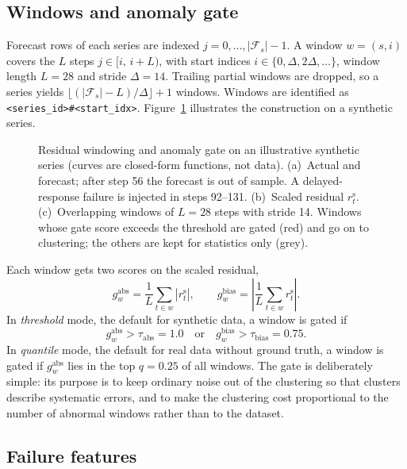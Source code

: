 \documentclass[10pt,twocolumn,a4paper]{article}
\newcommand{\rS}{r^{\mathrm{s}}}
\begin{document}
\subsection{Windows and anomaly gate}
\label{sec:gate}

Forecast rows of each series are indexed $j = 0,\dots,|\mathcal F_s|-1$. A window $w=(s,i)$ covers the $L$ steps $j\in[i,\,i+L)$, with start indices $i\in\{0,\Delta,2\Delta,\dots\}$, window length $L=28$ and stride $\Delta=14$. Trailing partial windows are dropped, so a series yields $\lfloor(|\mathcal F_s|-L)/\Delta\rfloor+1$ windows. Windows are identified as \texttt{<series\_id>\#<start\_idx>}. Figure~\ref{fig:window} illustrates the construction on a synthetic series.

\begin{figure}[t]
  \centering
  
  \caption{Residual windowing and anomaly gate on an illustrative synthetic series (curves are closed-form functions, not data). (a)~Actual and forecast; after step 56 the forecast is out of sample. A delayed-response failure is injected in steps 92--131. (b)~Scaled residual $\rS_t$. (c)~Overlapping windows of $L=28$ steps with stride 14. Windows whose gate score exceeds the threshold are gated (red) and go on to clustering; the others are kept for statistics only (grey).}
  \label{fig:window}
\end{figure}

Each window gets two scores on the scaled residual,
\begin{equation}
  g^{\mathrm{abs}}_w = \frac1L\sum_{t\in w}\left|\rS_t\right|,\qquad
  g^{\mathrm{bias}}_w = \left|\frac1L\sum_{t\in w}\rS_t\right|.
\end{equation}
In \emph{threshold} mode, the default for synthetic data, a window is gated if
\begin{equation}
  g^{\mathrm{abs}}_w > \tau_{\mathrm{abs}}=1.0 \quad\text{or}\quad g^{\mathrm{bias}}_w > \tau_{\mathrm{bias}}=0.75 .
\end{equation}
In \emph{quantile} mode, the default for real data without ground truth, a window is gated if $g^{\mathrm{abs}}_w$ lies in the top $q=0.25$ of all windows. The gate is deliberately simple: its purpose is to keep ordinary noise out of the clustering so that clusters describe systematic errors, and to make the clustering cost proportional to the number of abnormal windows rather than to the dataset.

\subsection{Failure features}
\label{sec:features}
\end{document}
